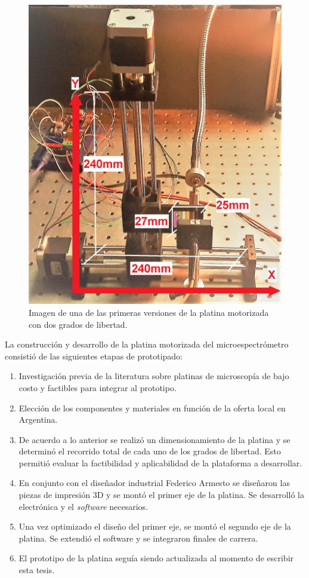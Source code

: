\begin{figure}[H]
	\centering
	\includegraphics[scale=0.15]{Figs/microespectrometro/stageearly.jpg}
	\caption{Imagen de una de las primeras versiones de la platina motorizada con dos grados de libertad.}
	\label{fig:plato0}
\end{figure}


La construcción y desarrollo de la platina motorizada del microespectrómetro consistió de las siguientes etapas de prototipado:

\begin{enumerate}
\item Investigación previa de la literatura sobre platinas de microscopía de bajo costo y factibles para integrar al prototipo.
\item Elección de los componentes y materiales en función de la oferta local en Argentina.
\item De acuerdo a lo anterior se realizó un dimensionamiento de la platina y se determinó el recorrido total de cada uno de los grados de libertad. Esto permitió evaluar la factibilidad y aplicabilidad de la plataforma a desarrollar.
\item En conjunto con el diseñador industrial Federico Armesto se diseñaron las piezas de impresión 3D y se montó el primer eje de la platina. Se desarrolló la electrónica y el \textit{software} necesarios.
\item Una vez optimizado el diseño del primer eje, se montó el segundo eje de la platina. Se extendió el software y se integraron finales de carrera.
\item El prototipo de la platina seguía siendo actualizada al momento de escribir esta tesis.
\end{enumerate}


